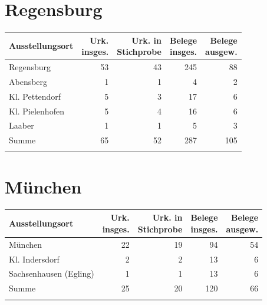 \section{Regensburg}

\begin{tabularx}{\linewidth}{X r r r r}
\lsptoprule
Ausstellungsort
	& \makecell{Urk.\\ insges.}
	& \makecell{Urk. in\\ Stichprobe}
	& \makecell{Belege\\ insges.}
	& \makecell{Belege\\ ausgew.}
	\\
\midrule

Regensburg
	& 53
	& 43
	& 245
	& 88
	\\

Abensberg
	& 1
	& 1
	& 4
	& 2
	\\

Kl. Pettendorf
	& 5
	& 3
	& 17
	& 6
	\\

Kl. Pielenhofen
	& 5
	& 4
	& 16
	& 6
	\\

Laaber
	& 1
	& 1
	& 5
	& 3
	\\

\midrule

Summe
	& 65
	& 52
	& 287
	& 105
	\\

\lspbottomrule
\end{tabularx}

\section{München}

\begin{tabularx}{\linewidth}{X r r r r}
\lsptoprule
Ausstellungsort
	& \makecell{Urk.\\ insges.}
	& \makecell{Urk. in\\ Stichprobe}
	& \makecell{Belege\\ insges.}
	& \makecell{Belege\\ ausgew.}
	\\
\midrule

München
	& 22
	& 19
	& 94
	& 54
	\\

Kl. Indersdorf
	& 2
	& 2
	& 13
	& 6
	\\

Sachsenhausen (Egling)
	& 1
	& 1
	& 13
	& 6
	\\

\midrule

Summe
	& 25
	& 20
	& 120
	& 66
	\\

\lspbottomrule
\end{tabularx}

